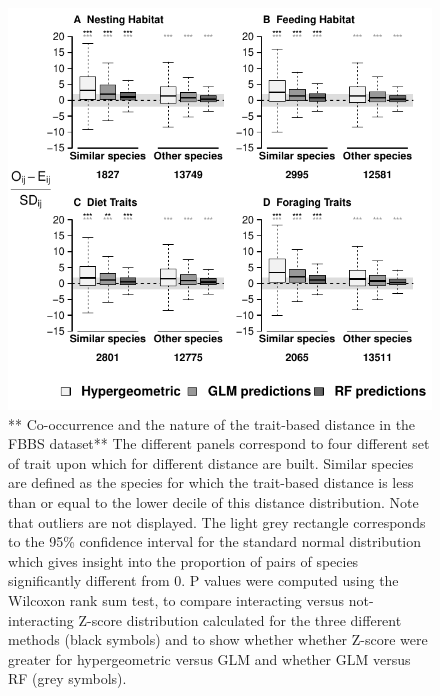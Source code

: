 \newpage

\begin{figure}[htbp]
\centering
\includegraphics{chapitre3/figS4.pdf}
\caption{** Co-occurrence and the nature of the trait-based distance in
the FBBS dataset** The different panels correspond to four different set
of trait upon which for different distance are built. Similar species
are defined as the species for which the trait-based distance is less
than or equal to the lower decile of this distance distribution. Note
that outliers are not displayed. The light grey rectangle corresponds to
the 95\% confidence interval for the standard normal distribution which
gives insight into the proportion of pairs of species significantly
different from 0. P values were computed using the Wilcoxon rank sum
test, to compare interacting versus not-interacting Z-score distribution
calculated for the three different methods (black symbols) and to show
whether whether Z-score were greater for hypergeometric versus GLM and
whether GLM versus RF (grey symbols).}\label{figdist}
\end{figure}

\newpage

